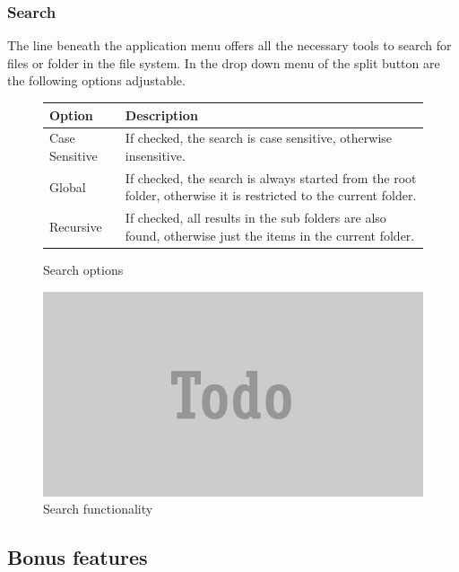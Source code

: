 \documentclass[JCDReport.tex]{subfiles}
\begin{document}
\subsubsection{Search}	
The line beneath the application menu offers all the necessary tools to search for files or folder in the file system. In the drop down menu of the split button are the following options adjustable.
\begin{figure}[h!]
	\centering
	\begin{tabular}{| l | p{10cm} |}
		\hline
		\textbf{Option} & \textbf{Description} \\ \hline \hline
		Case Sensitive & If checked, the search is case sensitive, otherwise insensitive. \\ \hline
		Global & If checked, the search is always started from the root folder, otherwise it is restricted to the current folder. \\ \hline
		Recursive & If checked, all results in the sub folders are also found, otherwise just the items in the current folder. \\ \hline
		\end{tabular}
	\caption{Search options}
\end{figure}

\begin{figure}[h!]
  \centering
  \includegraphics[scale=0.35]{Images/todo.png} 
  \caption{Search functionality}
\end{figure}

\subsection{Bonus features}
\end{document}
